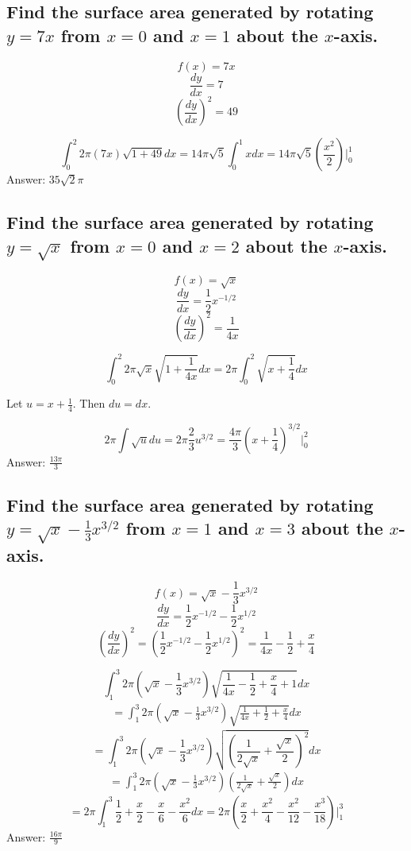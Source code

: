 \documentclass{article}
\begin{document}
\subsection{Find the surface area generated by rotating $y = 7x$ from $x = 0$ and $x = 1$ about the $x$-axis.}

\[f(x) = 7x\]
\[\frac{dy}{dx} =7\]
\[(\frac{dy}{dx})^2 = 49\]

\bigskip

\[\int_0^2 2\pi(7x)\sqrt{1+49} dx = 14\pi\sqrt{5} \int_0^1 x dx = 14\pi\sqrt{5} (\frac{x^2}{2}) \Big|_{0}^{1} \]
Answer: $35 \sqrt{2} \pi$

\subsection{Find the surface area generated by rotating $y = \sqrt{x}$ from $x = 0$ and $x = 2$ about the $x$-axis.}

\[f(x) = \sqrt{x}\]
\[\frac{dy}{dx} =\frac{1}{2} x^{-1/2}\]
\[(\frac{dy}{dx})^2 = \frac{1}{4x}\]

\bigskip

\[\int_0^2 2\pi \sqrt{x} \sqrt{1+\frac{1}{4x}}dx = 2\pi \int_0^2 \sqrt{x+ \frac{1}{4}} dx \]

Let $u = x+\frac{1}{4}$. Then $du=dx$. 

\[ 2\pi \int \sqrt{u} du = 2 \pi \frac{2}{3} u ^{3/2} = \frac{4 \pi}{3}(x+\frac{1}{4}) ^{3/2} \Big|_{0}^{2} \]
Answer: $\frac{13 \pi}{3}$

\subsection{Find the surface area generated by rotating $y = \sqrt{x} - \frac{1}{3}x^{3/2}$ from $x = 1$ and $x = 3$ about the $x$-axis.}

\[f(x) =  \sqrt{x} - \frac{1}{3}x^{3/2} \]
\[\frac{dy}{dx} = \frac{1}{2} x^{-1/2} - \frac{1}{2}x^{1/2}\]
\[(\frac{dy}{dx})^2 = (\frac{1}{2} x^{-1/2} - \frac{1}{2}x^{1/2})^2 = \frac{1}{4x} -\frac{1}{2} +\frac{x}{4} \]

\bigskip

\[ \int_1^3 2\pi(\sqrt{x} - \frac{1}{3}x^{3/2}) \sqrt{\frac{1}{4x} -\frac{1}{2} +\frac{x}{4} +1} dx  \]
\begin{align*}
	= \int_1^3 2\pi(\sqrt{x} - \frac{1}{3}x^{3/2}) \sqrt{\frac{1}{4x} +\frac{1}{2} +\frac{x}{4} } dx
\end{align*}
\[= \int_1^3 2\pi(\sqrt{x} - \frac{1}{3}x^{3/2}) \sqrt{(\frac{1}{2\sqrt{x}}+\frac{\sqrt{x}}{2})^2} dx\]
\begin{align*}
	= \int_1^3 2\pi(\sqrt{x} - \frac{1}{3}x^{3/2}) (\frac{1}{2\sqrt{x}}+\frac{\sqrt{x}}{2}) dx
\end{align*}
\[ = 2 \pi \int_1^3 \frac{1}{2} +\frac{x}{2} - \frac{x}{6} -\frac{x^2}{6} dx = 2 \pi( \frac{x}{2}+\frac{x^2}{4} - \frac{x^2}{12} -\frac{x^3}{18}) \Big|_{1}^{3} \]
Answer: $\frac{16\pi}{9} $
\end{document}
